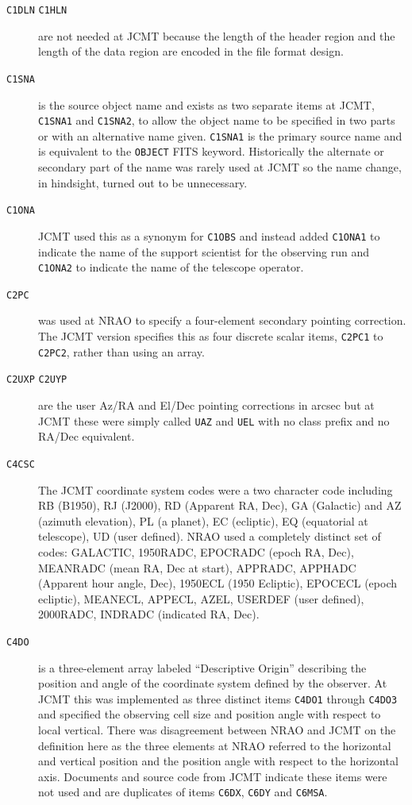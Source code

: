 \documentclass[final,authoryear,5p,times,twocolumn]{elsarticle}
\begin{document}
\begin{description}

\item[\texttt{C1DLN} \texttt{C1HLN}] are not needed at JCMT
  because the length of the header region and the length of the data
  region are encoded in the file format design.

\item[\texttt{C1SNA}] is the source object name and exists as two separate
  items at JCMT, \texttt{C1SNA1} and \texttt{C1SNA2}, to allow the
  object name to be specified in two parts or with an alternative name
  given. \texttt{C1SNA1} is the primary source name and is equivalent
  to the \texttt{OBJECT} FITS keyword. Historically the alternate or
  secondary part of the name was rarely used at JCMT so the name
  change, in hindsight, turned out to be unnecessary.

\item[\texttt{C1ONA}] JCMT used this as a synonym for \texttt{C1OBS}
  and instead added \texttt{C1ONA1} to indicate the name of the
  support scientist for the observing run and \texttt{C1ONA2} to
  indicate the name of the telescope operator.

\item[\texttt{C2PC}] was used at NRAO to specify a four-element
  secondary pointing correction. The JCMT version specifies this as
  four discrete scalar items, \texttt{C2PC1} to \texttt{C2PC2}, rather
  than using an array.

\item[\texttt{C2UXP} \texttt{C2UYP}] are the user Az/RA and El/Dec
  pointing corrections in arcsec but at JCMT these were simply called
  \texttt{UAZ} and \texttt{UEL} with no class prefix and no RA/Dec
  equivalent.

\item[\texttt{C4CSC}] The JCMT coordinate system codes \citep{mtdn12}
  were a two character code including RB (B1950), RJ (J2000), RD
  (Apparent RA, Dec), GA (Galactic) and AZ (azimuth elevation), PL (a
  planet), EC (ecliptic), EQ (equatorial at telescope), UD (user
  defined). NRAO used a completely distinct set of codes: GALACTIC,
  1950RADC, EPOCRADC (epoch RA, Dec), MEANRADC (mean RA, Dec at
  start), APPRADC, APPHADC (Apparent hour angle, Dec), 1950ECL (1950
  Ecliptic), EPOCECL (epoch ecliptic), MEANECL, APPECL, AZEL, USERDEF
  (user defined), 2000RADC, INDRADC (indicated RA, Dec).

\item[\texttt{C4DO}] is a three-element array labeled ``Descriptive
  Origin'' describing the position and angle of the coordinate system
  defined by the observer. At JCMT this was implemented as three
  distinct items \texttt{C4DO1} through \texttt{C4DO3} and specified
  the observing cell size and position angle with respect to local
  vertical. There was disagreement between NRAO and JCMT on the
  definition here as the three elements at NRAO referred to the
  horizontal and vertical position and the position angle with respect
  to the horizontal axis. Documents and source code from JCMT indicate
  these items were not used and are duplicates of items \texttt{C6DX},
  \texttt{C6DY} and \texttt{C6MSA}.


\end{description}
\end{document}
